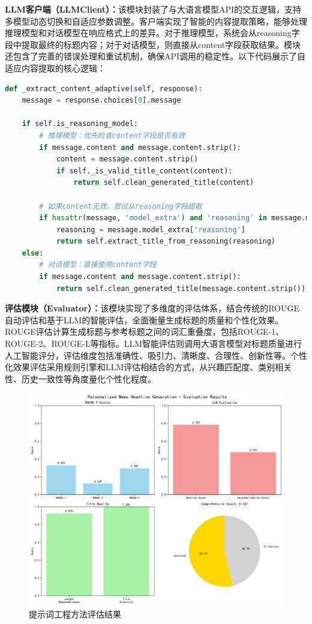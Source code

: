 \documentclass[10pt,a4paper]{article}
\begin{document}
\textbf{LLM客户端（LLMClient）：}该模块封装了与大语言模型API的交互逻辑，支持多模型动态切换和自适应参数调整。客户端实现了智能的内容提取策略，能够处理推理模型和对话模型在响应格式上的差异。对于推理模型，系统会从reasoning字段中提取最终的标题内容；对于对话模型，则直接从content字段获取结果。模块还包含了完善的错误处理和重试机制，确保API调用的稳定性。以下代码展示了自适应内容提取的核心逻辑：

\begin{lstlisting}[language=Python, caption=自适应内容提取]
def _extract_content_adaptive(self, response):
    message = response.choices[0].message
    
    if self.is_reasoning_model:
        # 推理模型：优先检查content字段是否有效
        if message.content and message.content.strip():
            content = message.content.strip()
            if self._is_valid_title_content(content):
                return self.clean_generated_title(content)
        
        # 如果content无效，尝试从reasoning字段提取
        if hasattr(message, 'model_extra') and 'reasoning' in message.model_extra:
            reasoning = message.model_extra['reasoning']
            return self.extract_title_from_reasoning(reasoning)
    else:
        # 对话模型：直接使用content字段
        if message.content and message.content.strip():
            return self.clean_generated_title(message.content.strip())
\end{lstlisting}

\textbf{评估模块（Evaluator）：}该模块实现了多维度的评估体系，结合传统的ROUGE自动评估和基于LLM的智能评估，全面衡量生成标题的质量和个性化效果。ROUGE评估计算生成标题与参考标题之间的词汇重叠度，包括ROUGE-1、ROUGE-2、ROUGE-L等指标。LLM智能评估则调用大语言模型对标题质量进行人工智能评分，评估维度包括准确性、吸引力、清晰度、合理性、创新性等。个性化效果评估采用规则引擎和LLM评估相结合的方式，从兴趣匹配度、类别相关性、历史一致性等角度量化个性化程度。

\begin{figure}[H]
  \centering
  \includegraphics[width=\textwidth]{fig/evaluation_chart_20250622_212308.png}   
  \caption{提示词工程方法评估结果}\label{fig:prompt_evaluation}
\end{figure}
\end{document}
